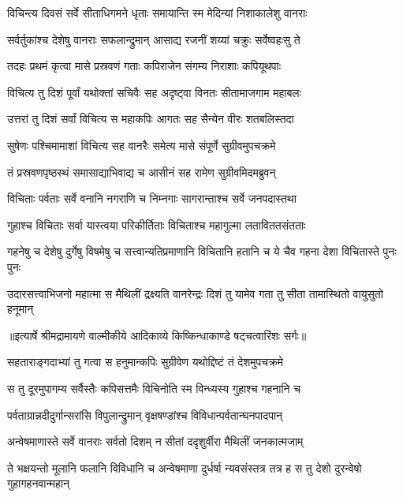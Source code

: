 \twolineshloka
{विचिन्त्य दिवसं सर्वे सीताधिगमने धृताः}
{समायान्ति स्म मेदिन्यां निशाकालेशु वानराः} %

\twolineshloka
{सर्वर्तुकांश्च देशेषु वानराः सफलान्द्रुमान्}
{आसाद्य रजनीं शय्यां चक्रुः सर्वेष्वहःसु ते} %

\twolineshloka
{तदहः प्रथमं कृत्वा मासे प्रस्रवणं गताः}
{कपिराजेन संगम्य निराशाः कपियूथपाः} %

\twolineshloka
{विचित्य तु दिशं पूर्वां यथोक्तां सचिवैः सह}
{अदृष्ट्वा विनतः सीतामाजगाम महाबलः} %

\twolineshloka
{उत्तरां तु दिशं सर्वां विचित्य स महाकपिः}
{आगतः सह सैन्येन वीरः शतबलिस्तदा} %

\twolineshloka
{सुषेणः पश्चिमामाशां विचित्य सह वानरैः}
{समेत्य मासे संपूर्णे सुग्रीवमुपचक्रमे} %

\twolineshloka
{तं प्रस्रवणपृष्ठस्थं समासाद्याभिवाद्य च}
{आसीनं सह रामेण सुग्रीवमिदमब्रुवन्} %

\twolineshloka
{विचिताः पर्वताः सर्वे वनानि नगराणि च}
{निम्नगाः सागरान्ताश्च सर्वे जनपदास्तथा} %

\twolineshloka
{गुहाश्च विचिताः सर्वा यास्त्वया परिकीर्तिताः}
{विचिताश्च महागुल्मा लताविततसंतताः} %

\threelineshloka
{गहनेषु च देशेषु दुर्गेषु विषमेषु च}
{सत्त्वान्यतिप्रमाणानि विचितानि हतानि च}
{ये चैव गहना देशा विचितास्ते पुनः पुनः} %

\fourlineindentedshloka
{उदारसत्त्वाभिजनो महात्मा}
{ स मैथिलीं द्रक्ष्यति वानरेन्द्रः}
{दिशं तु यामेव गता तु सीता}
{ तामास्थितो वायुसुतो हनूमान्} %


{॥इत्यार्षे श्रीमद्रामायणे वाल्मीकीये आदिकाव्ये किष्किन्धाकाण्डे षट्चत्वारिंशः सर्गः॥}


\twolineshloka
{सहताराङ्गदाभ्यां तु गत्वा स हनुमान्कपिः}
{सुग्रीवेण यथोद्दिष्टं तं देशमुपचक्रमे} %

\twolineshloka
{स तु दूरमुपागम्य सर्वैस्तैः कपिसत्तमैः}
{विचिनोति स्म विन्ध्यस्य गुहाश्च गहनानि च} %

\twolineshloka
{पर्वताग्रान्नदीदुर्गान्सरांसि विपुलान्द्रुमान्}
{वृक्षषण्डांश्च विविधान्पर्वतान्घनपादपान्} %

\twolineshloka
{अन्वेषमाणास्ते सर्वे वानराः सर्वतो दिशम्}
{न सीतां ददृशुर्वीरा मैथिलीं जनकात्मजाम्} %

\threelineshloka
{ते भक्षयन्तो मूलानि फलानि विविधानि च}
{अन्वेषमाणा दुर्धर्षा न्यवसंस्तत्र तत्र ह}
{स तु देशो दुरन्वेषो गुहागहनवान्महान्} %

